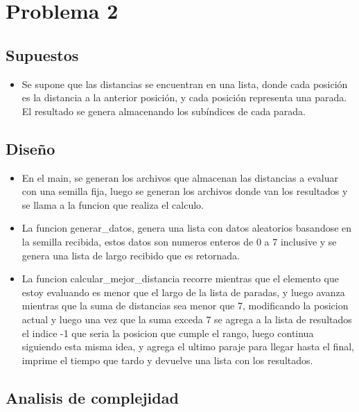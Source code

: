 \documentclass[a4paper, 12pt]{article}
\begin{document}
\section{Problema 2}

\subsection{Supuestos}

\begin{itemize}
	\item Se supone que las distancias se encuentran en una lista, donde cada posición es la distancia a la anterior posición, y cada posición representa una parada. El resultado se genera almacenando los subíndices de cada parada.
\end{itemize}

\subsection{Diseño}

\begin{itemize}
    \item En el main, se generan los archivos que almacenan las distancias a evaluar con una semilla fija, luego se generan los archivos donde van los resultados y se llama a la funcion que realiza el calculo.
    \item La funcion generar\_datos, genera una lista con datos aleatorios basandose en la semilla recibida, estos datos son numeros enteros de 0 a 7 inclusive y se genera una lista de largo recibido que es retornada.
    \item La funcion calcular\_mejor\_distancia recorre mientras que el elemento que estoy evaluando es menor que el largo de la lista de paradas, y luego avanza mientras que la suma de distancias sea menor que 7, modificando la posicion actual y luego una vez que la suma exceda 7 se agrega a la lista de resultados el indice -1 que seria la posicion que cumple el rango, luego continua siguiendo esta misma idea, y agrega el ultimo paraje para llegar hasta el final, imprime el tiempo que tardo y devuelve una lista con los resultados.
    
\end{itemize}

\subsection{Analisis de complejidad}
\end{document}
